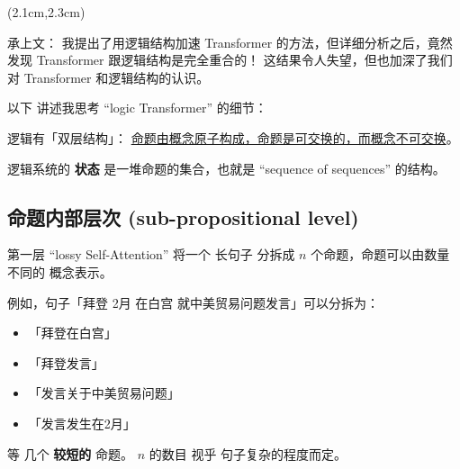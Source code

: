 \begin{preview}

\cc{
\title{\vspace{-1.5cm} \bfseries\color{blue}{\LARGE Transformer 完全符合逻辑结构}}
}{
\title{\vspace{-1.5cm} \bfseries\color{blue}{\LARGE Transformer Has Full Logic Structure}}
}

\date{\vspace{-2cm}} %

\maketitle

\setcounter{section}{-1}

\begin{textblock*}{5cm}(2.1cm,2.3cm) %
{}
\end{textblock*}

\begin{minipage}{\textwidth}
\setlength{\parskip}{0.4\baselineskip}

承上文： 我提出了用逻辑结构加速 Transformer 的方法，但详细分析之后，竟然发现 Transformer 跟逻辑结构是完全重合的！ 这结果令人失望，但也加深了我们对 Transformer 和逻辑结构的认识。

以下 讲述我思考 ``logic Transformer'' 的细节：

逻辑有「双层结构」： \uline{命题由概念原子构成，命题是可交换的，而概念不可交换}。 

逻辑系统的 \textbf{状态} 是一堆命题的集合，也就是 ``sequence of sequences'' 的结构。 


\subsection{命题内部层次 (sub-propositional level)}

第一层 ``lossy Self-Attention'' 将一个 长句子 分拆成 $n$ 个命题，命题可以由数量不同的 概念表示。 

例如，句子「拜登 2月 在白宫 就中美贸易问题发言」可以分拆为：
\begin{itemize}
	\item 「拜登在白宫」
	\item 「拜登发言」
	\item 「发言关于中美贸易问题」
	\item 「发言发生在2月」
\end{itemize}
等 几个 \textbf{较短的} 命题。 $n$ 的数目 视乎 句子复杂的程度而定。


\end{minipage}
\end{preview}
